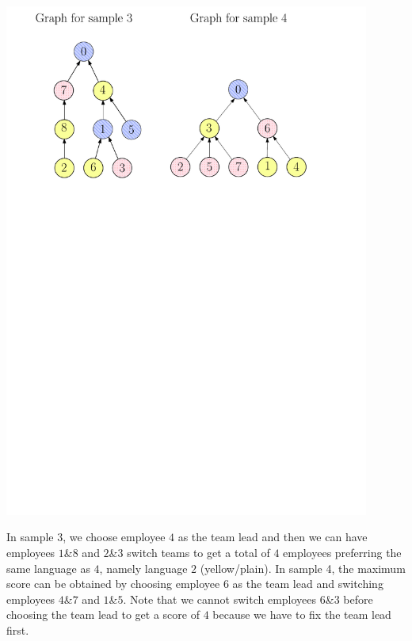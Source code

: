 \includegraphics[width=0.9\textwidth]{kattis_e3e4}

In sample 3, we choose employee $4$ as the team lead and then we can have employees $1$\&$8$ and $2$\&$3$ switch teams to get a total of $4$ employees preferring the same language as $4$, namely language $2$ (yellow/plain).
In sample 4, the maximum score can be obtained by choosing employee $6$ as the team lead and switching employees $4$\&$7$ and $1$\&$5$. Note that we cannot switch employees $6$\&$3$ before choosing the team lead to get a score of $4$ because we have to fix the team lead first.
